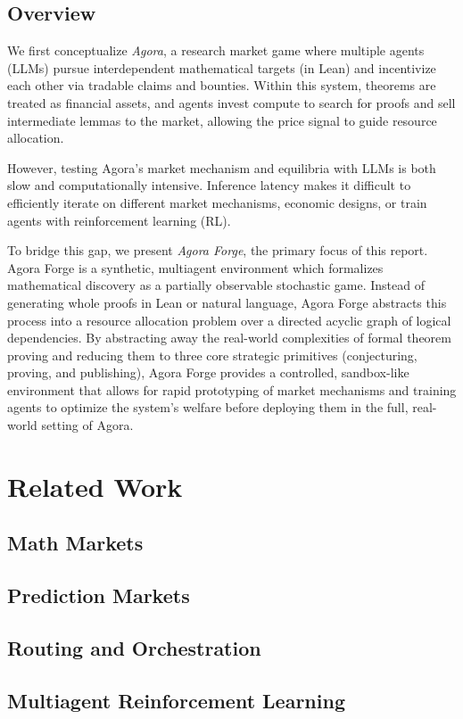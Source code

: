\documentclass[letterpaper]{article} %
\begin{document}
\subsection{Overview} %
We first conceptualize \textit{Agora}, a research market game where multiple agents (LLMs) pursue interdependent mathematical targets (in Lean) and incentivize each other via tradable claims and bounties. Within this system, theorems are treated as financial assets, and agents invest compute to search for proofs and sell intermediate lemmas to the market, allowing the price signal to guide resource allocation.

However, testing Agora's market mechanism and equilibria with LLMs is both slow and computationally intensive. Inference latency makes it difficult to efficiently iterate on different market mechanisms, economic designs, or train agents with reinforcement learning (RL).

To bridge this gap, we present \textit{Agora Forge}, the primary focus of this report. Agora Forge is a synthetic, multiagent environment which formalizes mathematical discovery as a partially observable stochastic game. Instead of generating whole proofs in Lean or natural language, Agora Forge abstracts this process into a resource allocation problem over a directed acyclic graph of logical dependencies. By abstracting away the real-world complexities of formal theorem proving and reducing them to three core strategic primitives (conjecturing, proving, and publishing), Agora Forge provides a controlled, sandbox-like environment that allows for rapid prototyping of market mechanisms and training agents to optimize the system's welfare before deploying them in the full, real-world setting of Agora.
\section{Related Work}
\subsection{Math Markets}
\subsection{Prediction Markets}
\subsection{Routing and Orchestration}
\subsection{Multiagent Reinforcement Learning}
\end{document}
